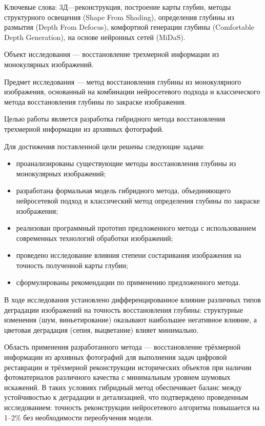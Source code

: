 

\begin{essay}{}
    Ключевые слова:
    3Д---реконструкция,
    построение карты глубин,
    методы структурного освещения (Shape From Shading),
    определения глубины из размытия (Depth From Defocus),
    комфортной генерации глубины (Comfortable Depth Generation),
    на основе нейронных сетей (MiDaS).

    Объект исследования --- восстановление трехмерной информации из монокулярных изображений.

    Предмет исследования --- метод восстановления глубины из монокулярного изображения,
    основанный на комбинации нейросетевого подхода и классического метода восстановления глубины по закраске изображения.


     Целью работы является разработка гибридного метода восстановления
     трехмерной информации из архивных фотографий.

    Для достижения поставленной цели решены следующие задачи:
    \begin{itemize}
        \item проанализированы существующие методы восстановления глубины из
        монокулярных изображений;
        \item разработана формальная модель гибридного метода, объединяющего нейросетевой подход и классический метод определения глубины по закраске изображения;
        \item реализован программный прототип предложенного метода с использованием современных технологий обработки изображений;
        \item проведено исследование влияния степени состаривания изображения на точность полученной карты глубин;
        \item сформулированы рекомендации по применению предложенного метода.
    \end{itemize}


    В ходе исследования установлено дифференцированное влияние различных типов деградации изображений на точность восстановления глубины:
     структурные изменения (шум, виньетирование) оказывают наибольшее негативное влияние, а цветовая деградация (сепия, выцветание) влияет минимально.

    Область применения разработанного метода --- восстановление трёхмерной информации из архивных фотографий для выполнения задач цифровой реставрации и трёхмерной реконструкции исторических объектов
     при наличии фотоматериалов различного качества с минимальным уровнем шумовых искажений.
    В таких условиях гибридный метод обеспечивает баланс между устойчивостью
    к деградации и детализацией, что подтверждено проведенным исследованием:
    точность реконструкции нейросетевого алгоритма повышается на 1--2\% без необходимости переобучения модели.


\end{essay}
